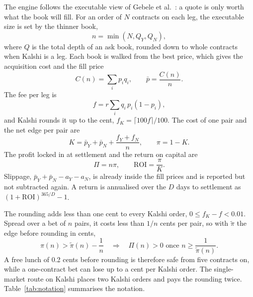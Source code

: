 \documentclass[5p,letterpaper]{elsarticle}
\begin{document}
The engine follows the executable view of Gebele et al.\ \cite{gebele2026executable}: a quote is only worth what the book will fill. For an order of $N$ contracts on each leg, the executable size is set by the thinner book,
\begin{equation}\label{eq:size}
n = \min(N, Q_Y, Q_N),
\end{equation}
where $Q$ is the total depth of an ask book, rounded down to whole contracts when Kalshi is a leg. Each book is walked from the best price, which gives the acquisition cost and the fill price
\begin{equation}\label{eq:walk}
C(n) = \sum_i p_i q_i, \qquad \bar p = \frac{C(n)}{n}.
\end{equation}
The fee per leg is
\begin{equation}\label{eq:fee}
f = r \sum_i q_i\, p_i (1 - p_i),
\end{equation}
and Kalshi rounds it up to the cent, $f_K = \lceil 100 f \rceil / 100$. The cost of one pair and the net edge per pair are
\begin{equation}\label{eq:cost}
K = \bar p_Y + \bar p_N + \frac{f_Y + f_N}{n}, \qquad \pi = 1 - K .
\end{equation}
The profit locked in at settlement and the return on capital are
\begin{equation}\label{eq:profit}
\Pi = n \pi, \qquad \mathrm{ROI} = \frac{\pi}{K}.
\end{equation}
Slippage, $\bar p_Y + \bar p_N - a_Y - a_N$, is already inside the fill prices and is reported but not subtracted again. A return is annualised over the $D$ days to settlement as $(1+\mathrm{ROI})^{365/D} - 1$.

The rounding adds less than one cent to every Kalshi order, $0 \le f_K - f < 0.01$. Spread over a bet of $n$ pairs, it costs less than $1/n$ cents per pair, so with $\tilde\pi$ the edge before rounding in cents,
\begin{equation}\label{eq:breakeven}
\pi(n) > \tilde\pi(n) - \frac{1}{n} \quad\Rightarrow\quad \Pi(n) > 0 \text{ once } n \ge \frac{1}{\tilde\pi(n)} .
\end{equation}
A free lunch of 0.2 cents before rounding is therefore safe from five contracts on, while a one-contract bet can lose up to a cent per Kalshi order. The single-market route on Kalshi places two Kalshi orders and pays the rounding twice. Table~\ref{tab:notation} summarises the notation.
\end{document}
